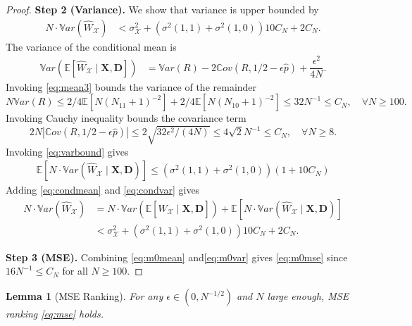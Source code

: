 \documentclass[12pt]{article}
\numberwithin{equation}{section}
\theoremstyle{plain}                         %
\newtheorem{lemma}{Lemma}
\theoremstyle{definition}                  %
\theoremstyle{remark}                      %
\newcommand{\E}{\mathbb{E}}
\newcommand{\Var}{\mathbb{V}ar}
\newcommand{\Cov}{\mathbb{C}ov}
\begin{document}
\begin{proof}[Proof]
\noindent 
\textbf{Step 2  (Variance).}\; We show that variance  is upper bounded by
 \begin{align}
N \cdot \Var (\widehat{W}_{\mathcal{X}}) &<\sigma^2_{\mathcal{X}} + (\sigma^2(1,1)+\sigma^2(1,0))10 C_N +2 C_N   .\label{eq:m0var}
 \end{align}
The variance of the conditional mean is 
\begin{align}
\Var (\E [ \widehat{W}_{\mathcal{X}} \mid \mathbf{X}, \mathbf{D}  ]) &= \Var (R) - 2  \Cov(R, 1/2-\epsilon  \widehat p )+ \dfrac{\epsilon^2}{4N}. \label{eq:condmean}
\end{align}
Invoking \eqref{eq:mean3} bounds the variance of the remainder
$$
N \Var (R)  \leq 2/4 \E [N  (N_{11} + 1)^{-2}] + 2/4 \E [  N(N_{10}  + 1)^{-2} ] \leq 32 N^{-1} \leq C_N, \quad \forall N \geq 100.
$$
Invoking  Cauchy inequality bounds the covariance term
$$
2 N | \Cov(R, 1/2-\epsilon  \widehat p ) |  \leq 2\sqrt{ 32 \epsilon^2/(4N)  } \leq 4 \sqrt{2} N^{-1} \leq C_N, \quad \forall N \geq 8.
$$
Invoking \eqref{eq:varbound} gives 
\begin{align}
\label{eq:condvar}
 \E [ N \cdot \Var (\widehat{W}_{\mathcal{X}} \mid \mathbf{X}, \mathbf{D}  ) ]  \leq (\sigma^2(1,1)+\sigma^2(1,0))(1+10 C_N)  
\end{align}
Adding \eqref{eq:condmean} and \eqref{eq:condvar} gives
\begin{align*}
N \cdot \Var (\widehat{W}_{\mathcal{X}}) &= N \cdot  \Var (\E [ \widehat{W}_{\mathcal{X}} \mid \mathbf{X}, \mathbf{D}  ]) + \E [ N \cdot \Var (\widehat{W}_{\mathcal{X}} \mid \mathbf{X}, \mathbf{D}  ) ]\\
&< \sigma^2_{\mathcal{X}} + (\sigma^2(1,1)+\sigma^2(1,0))10 C_N +2 C_N.
\end{align*}


\noindent 
\textbf{Step 3 (MSE).}\;  Combining \eqref{eq:m0mean} and\eqref{eq:m0var} gives \eqref{eq:m0mse} since  $16 N^{-1} \leq C_N$ for all $N \geq 100$.
  \end{proof}





\begin{lemma}[MSE Ranking]
\label{lem:mylem21}
For any $\epsilon \in (0, N^{-1/2})$ and $N$ large enough, MSE ranking  \eqref{eq:mse}  holds.
\end{lemma}
\end{document}
